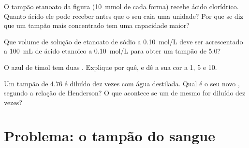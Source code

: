 \begin{exercise}[$\star\star\star$]\label{exo:g12:buffers-predominance:12}
O tampão etanoato da figura (\qty{10}{mmol} de cada forma) recebe ácido
clorídrico. Quanto ácido ele pode receber antes que o seu  caia uma
unidade? Por que se diz que um tampão mais concentrado tem uma
capacidade maior?
\end{exercise}

\begin{exercise}[$\star\star\star$]\label{exo:g12:buffers-predominance:13}
Que volume de solução de etanoato de sódio a \qty{0.10}{mol/L} deve ser
acrescentado a \qty{100}{mL} de ácido etanoico a \qty{0.10}{mol/L} para
obter um tampão de  5.0?
\end{exercise}

\begin{exercise}[$\star\star\star$]\label{exo:g12:buffers-predominance:14}
O azul de timol tem duas . Explique por quê, e dê a
sua cor a  1, 5 e 10.
\end{exercise}

\begin{exercise}[$\star\star\star$]\label{exo:g12:buffers-predominance:15}
Um tampão de  4.76 é diluído dez vezes com água destilada. Qual é o
seu novo , segundo a relação de Henderson? O que acontece se um  de mesmo  for diluído dez vezes?
\end{exercise}

\section{Problema: o tampão do sangue}

